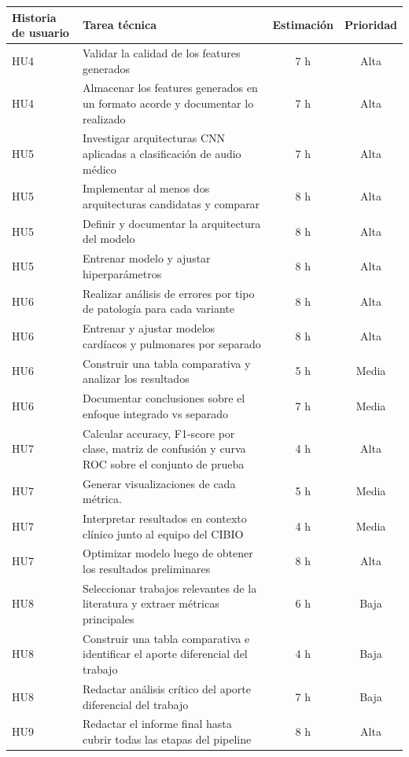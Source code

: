 \documentclass[
11pt, %
]{charter}
\begin{document}
\begin{table}[htpb]
\begin{tabularx}{\linewidth}{@{}|X|X|c|c|@{}}
\hline
\rowcolor[HTML]{C0C0C0}
Historia de usuario & Tarea técnica & Estimación & Prioridad \\ \hline
HU4 & Validar la calidad de los features generados & 7 h & Alta \\ \hline
HU4 & Almacenar los features generados en un formato acorde y documentar lo realizado & 7 h & Alta \\ \hline
HU5 & Investigar arquitecturas CNN aplicadas a clasificación de audio médico & 7 h & Alta \\ \hline
HU5 & Implementar al menos dos arquitecturas candidatas y comparar & 8 h & Alta \\ \hline
HU5 & Definir y documentar la arquitectura del modelo & 8 h & Alta \\ \hline
HU5 & Entrenar modelo y ajustar hiperparámetros & 8 h & Alta \\ \hline
HU6 & Realizar análisis de errores por tipo de patología para cada variante & 8 h & Alta \\ \hline
HU6 & Entrenar y ajustar modelos cardíacos y pulmonares por separado  & 8 h & Alta \\ \hline
HU6 & Construir una tabla comparativa y analizar los resultados & 5 h & Media \\ \hline
HU6 & Documentar conclusiones sobre el enfoque integrado vs separado & 7 h & Media \\ \hline
HU7 & Calcular accuracy, F1-score por clase, matriz de confusión y curva ROC sobre el conjunto de prueba & 4 h & Alta \\ \hline
HU7 & Generar visualizaciones de cada métrica. & 5 h & Media \\ \hline
HU7 & Interpretar resultados en contexto clínico junto al equipo del CIBIO & 4 h & Media \\ \hline
HU7 & Optimizar modelo luego de obtener los resultados preliminares & 8 h & Alta \\ \hline 
HU8 & Seleccionar trabajos relevantes de la literatura y extraer métricas principales & 6 h & Baja \\ \hline
HU8 & Construir una tabla comparativa e identificar el aporte diferencial del trabajo & 4 h & Baja \\ \hline
HU8 & Redactar análisis crítico del aporte diferencial del trabajo & 7 h & Baja \\ \hline
HU9 & Redactar el informe final hasta cubrir todas las etapas del pipeline & 8 h & Alta \\ \hline
\end{tabularx}
\end{table}
\end{document}
